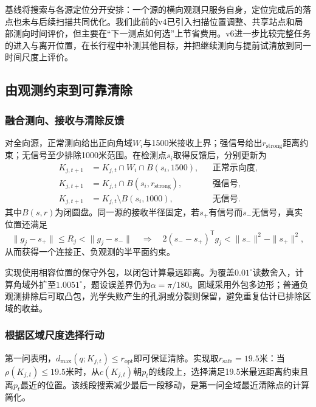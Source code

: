 基线将搜索与各源定位分开安排：一个源的横向观测只服务自身，定位完成后的落点也未与后续扫描共同优化。我们此前的v4已引入扫描位置调整、共享站点和局部测向时间评价，但主要在“下一测点如何选”上节省费用。v6进一步比较完整任务的进入与离开位置，在长行程中补测其他目标，并把继续测向与提前试清放到同一时间尺度上评价。

\subsection{由观测约束到可靠清除}

\subsubsection{融合测向、接收与清除反馈}

对全向源，正常测向给出正向角域$W_i$与1500米接收上界；强信号给出$r_{\mathrm{strong}}$距离约束；无信号至少排除1000米范围。在检测点$s_i$取得反馈后，分别更新为
\begin{equation}
\begin{aligned}
 K_{j,t+1}&=K_{j,t}\cap W_i\cap B(s_i,1500), &&\text{正常示向度},\\
 K_{j,t+1}&=K_{j,t}\cap B(s_i,r_{\mathrm{strong}}), &&\text{强信号},\\
 K_{j,t+1}&=K_{j,t}\setminus B(s_i,1000), &&\text{无信号}.
\end{aligned}
\label{eq:q3-update}
\end{equation}
其中$B(s,r)$为闭圆盘。同一源的接收半径固定，若$s_+$有信号而$s_-$无信号，真实位置还满足
\begin{equation}
\|g_j-s_+\|\le R_j<\|g_j-s_-\|
\quad\Longrightarrow\quad
2(s_--s_+)^{\mathsf T}g_j<\|s_-\|^2-\|s_+\|^2,
\label{eq:q3-coupling}
\end{equation}
从而获得一个连接正、负观测的半平面约束。

实现使用相容位置的保守外包，以闭包计算最远距离。为覆盖$0.01^\circ$读数舍入，计算角域外扩至$1.0051^\circ$，题设误差界仍为$\alpha=\pi/180$。圆域采用外包多边形；普通负观测排除后可取凸包，光学失败产生的孔洞或分裂则保留，避免重复估计已排除区域的收益。

\subsubsection{根据区域尺度选择行动}

第一问表明，$d_{\max}(q;K_{j,t})\le r_{\mathrm{opt}}$即可保证清除。实现取$r_{\mathrm{safe}}=19.5$米：当$\rho(K_{j,t})\le19.5$米时，从$c(K_{j,t})$朝$p_t$的线段上，选择满足19.5米最远距离约束且离$p_t$最近的位置。该线段搜索减少最后一段移动，是第一问全域最近清除点的计算简化。

